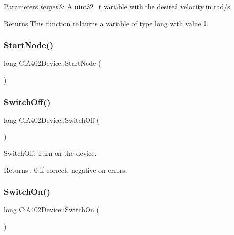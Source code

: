 \begin{DoxyParams}{Parameters}
{\em target} & A uint32\+\_\+t variable with the desired velocity in rad/s \\
\hline
\end{DoxyParams}
\begin{DoxyReturn}{Returns}
This function re1turns a variable of type long with value 0. 
\end{DoxyReturn}
\mbox{\label{classCiA402Device_a32b4628098364846fe291312025f6fda}} 
\subsubsection{\texorpdfstring{Start\+Node()}{StartNode()}}
{\footnotesize\ttfamily long Ci\+A402\+Device\+::\+Start\+Node (\begin{DoxyParamCaption}{ }\end{DoxyParamCaption})}

\mbox{\label{classCiA402Device_a97acf47b3e3751c85fa70091d3bdfa6a}} 
\subsubsection{\texorpdfstring{Switch\+Off()}{SwitchOff()}}
{\footnotesize\ttfamily long Ci\+A402\+Device\+::\+Switch\+Off (\begin{DoxyParamCaption}{ }\end{DoxyParamCaption})}



Switch\+Off\+: Turn on the device. 

\begin{DoxyReturn}{Returns}
\+: 0 if correct, negative on errors. 
\end{DoxyReturn}
\mbox{\label{classCiA402Device_ab77bce0d7f42429f5f8f092aacb02754}} 
\subsubsection{\texorpdfstring{Switch\+On()}{SwitchOn()}}
{\footnotesize\ttfamily long Ci\+A402\+Device\+::\+Switch\+On (\begin{DoxyParamCaption}{ }\end{DoxyParamCaption})}



